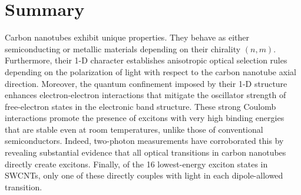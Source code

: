 \section{Summary}

Carbon nanotubes exhibit unique properties. They behave as either semiconducting or metallic materials depending on their chirality $(n,m)$. Furthermore, their 1-D character establishes anisotropic optical selection rules depending on the polarization of light with respect to the carbon nanotube axial direction. Moreover, the quantum confinement imposed by their 1-D structure enhances electron-electron interactions that mitigate the oscillator strength of free-electron states in the electronic band structure. These strong Coulomb interactions promote the presence of excitons with very high binding energies that are stable even at room temperatures, unlike those of conventional semiconductors. Indeed, two-photon measurements have corroborated this by revealing substantial evidence that all optical transitions in carbon nanotubes directly create excitons. Finally, of the 16 lowest-energy exciton states in SWCNTs, only one of these directly couples with light in each dipole-allowed transition.
